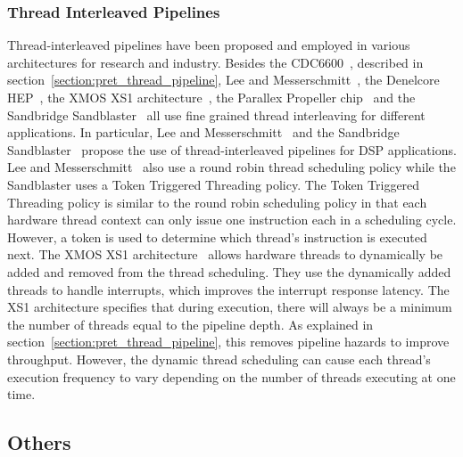 \subsubsection{Thread Interleaved Pipelines}
Thread-interleaved pipelines have been proposed and employed in various architectures for research and industry. 
Besides the CDC6600~\cite{CDC6600}, described in section~\ref{section:pret_thread_pipeline}, Lee and Messerschmitt~\cite{lee1987pip}, the Denelcore HEP~\cite{HEP}, the XMOS XS1 architecture~\cite{xmos_xs1}, the Parallex Propeller chip~\cite{parallex} and the Sandbridge Sandblaster~\cite{Erdem02multi-threadedprocessor} all use fine grained thread interleaving for different applications. 
In particular, Lee and Messerschmitt~\cite{lee1987pip} and the Sandbridge Sandblaster~\cite{Erdem02multi-threadedprocessor} propose the use of thread-interleaved pipelines for DSP applications. Lee and Messerschmitt~\cite{lee1987pip} also use a round robin thread scheduling policy while the Sandblaster uses a Token Triggered Threading policy. 
The Token Triggered Threading policy is similar to the round robin scheduling policy in that each hardware thread context can only issue one instruction each in a scheduling cycle. 
However, a token is used to determine which thread's instruction is executed next. 
The XMOS XS1 architecture~\cite{xmos_xs1} allows hardware threads to dynamically be added and removed from the thread scheduling.
They use the dynamically added threads to handle interrupts, which improves the interrupt response latency. 
The XS1 architecture specifies that during execution, there will always be a minimum the number of threads equal to the pipeline depth. 
As explained in section~\ref{section:pret_thread_pipeline}, this removes pipeline hazards to improve throughput.
However, the dynamic thread scheduling can cause each thread's execution frequency to vary depending on the number of threads executing at one time.         

\subsection{Others}
